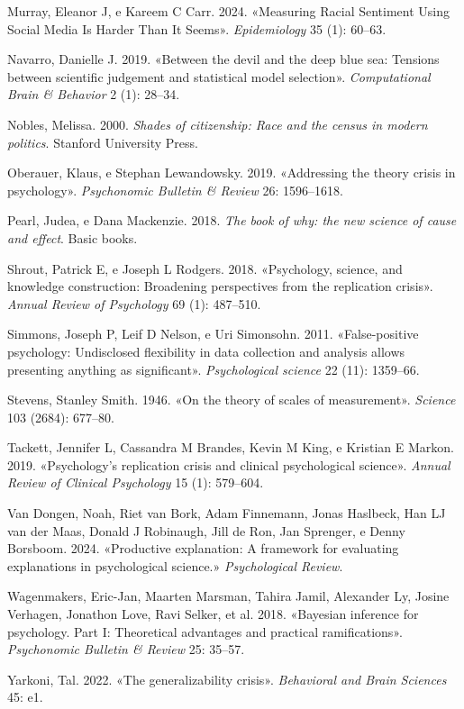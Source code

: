 \documentclass[
  letterpaper,
  krantz2]{{[}./krantz{]}}
\newlength{\cslhangindent}
\newenvironment{CSLReferences}[2] %
 {\begin{list}{}{%
  \setlength{\itemindent}{0pt}
  \setlength{\leftmargin}{0pt}
  \setlength{\parsep}{0pt}
  \ifodd #1
   \setlength{\leftmargin}{\cslhangindent}
   \setlength{\itemindent}{-1\cslhangindent}
  \fi
  \setlength{\itemsep}{#2\baselineskip}}}
 {\end{list}}
\begin{document}
\begin{CSLReferences}{1}{0}
Murray, Eleanor J, e Kareem C Carr. 2024. {«Measuring Racial Sentiment
Using Social Media Is Harder Than It Seems»}. \emph{Epidemiology} 35
(1): 60--63.

Navarro, Danielle J. 2019. {«Between the devil and the deep blue sea:
Tensions between scientific judgement and statistical model selection»}.
\emph{Computational Brain \& Behavior} 2 (1): 28--34.

Nobles, Melissa. 2000. \emph{Shades of citizenship: Race and the census
in modern politics}. Stanford University Press.

Oberauer, Klaus, e Stephan Lewandowsky. 2019. {«Addressing the theory
crisis in psychology»}. \emph{Psychonomic Bulletin \& Review} 26:
1596--1618.

Pearl, Judea, e Dana Mackenzie. 2018. \emph{The book of why: the new
science of cause and effect}. Basic books.

Shrout, Patrick E, e Joseph L Rodgers. 2018. {«Psychology, science, and
knowledge construction: Broadening perspectives from the replication
crisis»}. \emph{Annual Review of Psychology} 69 (1): 487--510.

Simmons, Joseph P, Leif D Nelson, e Uri Simonsohn. 2011.
{«False-positive psychology: Undisclosed flexibility in data collection
and analysis allows presenting anything as significant»}.
\emph{Psychological science} 22 (11): 1359--66.

Stevens, Stanley Smith. 1946. {«On the theory of scales of
measurement»}. \emph{Science} 103 (2684): 677--80.

Tackett, Jennifer L, Cassandra M Brandes, Kevin M King, e Kristian E
Markon. 2019. {«Psychology's replication crisis and clinical
psychological science»}. \emph{Annual Review of Clinical Psychology} 15
(1): 579--604.

Van Dongen, Noah, Riet van Bork, Adam Finnemann, Jonas Haslbeck, Han LJ
van der Maas, Donald J Robinaugh, Jill de Ron, Jan Sprenger, e Denny
Borsboom. 2024. {«Productive explanation: A framework for evaluating
explanations in psychological science.»} \emph{Psychological Review}.

Wagenmakers, Eric-Jan, Maarten Marsman, Tahira Jamil, Alexander Ly,
Josine Verhagen, Jonathon Love, Ravi Selker, et al. 2018. {«Bayesian
inference for psychology. Part I: Theoretical advantages and practical
ramifications»}. \emph{Psychonomic Bulletin \& Review} 25: 35--57.

Yarkoni, Tal. 2022. {«The generalizability crisis»}. \emph{Behavioral
and Brain Sciences} 45: e1.

\end{CSLReferences}



\printindex
\end{document}
